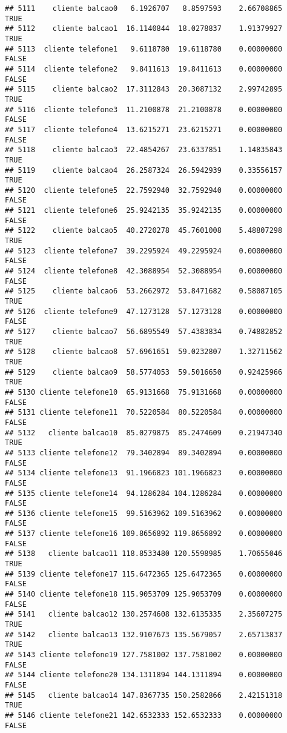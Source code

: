 \documentclass[
]{article}
\begin{document}
\begin{verbatim}
## 5111    cliente balcao0   6.1926707   8.8597593    2.66708865     TRUE
## 5112    cliente balcao1  16.1140844  18.0278837    1.91379927     TRUE
## 5113  cliente telefone1   9.6118780  19.6118780    0.00000000    FALSE
## 5114  cliente telefone2   9.8411613  19.8411613    0.00000000    FALSE
## 5115    cliente balcao2  17.3112843  20.3087132    2.99742895     TRUE
## 5116  cliente telefone3  11.2100878  21.2100878    0.00000000    FALSE
## 5117  cliente telefone4  13.6215271  23.6215271    0.00000000    FALSE
## 5118    cliente balcao3  22.4854267  23.6337851    1.14835843     TRUE
## 5119    cliente balcao4  26.2587324  26.5942939    0.33556157     TRUE
## 5120  cliente telefone5  22.7592940  32.7592940    0.00000000    FALSE
## 5121  cliente telefone6  25.9242135  35.9242135    0.00000000    FALSE
## 5122    cliente balcao5  40.2720278  45.7601008    5.48807298     TRUE
## 5123  cliente telefone7  39.2295924  49.2295924    0.00000000    FALSE
## 5124  cliente telefone8  42.3088954  52.3088954    0.00000000    FALSE
## 5125    cliente balcao6  53.2662972  53.8471682    0.58087105     TRUE
## 5126  cliente telefone9  47.1273128  57.1273128    0.00000000    FALSE
## 5127    cliente balcao7  56.6895549  57.4383834    0.74882852     TRUE
## 5128    cliente balcao8  57.6961651  59.0232807    1.32711562     TRUE
## 5129    cliente balcao9  58.5774053  59.5016650    0.92425966     TRUE
## 5130 cliente telefone10  65.9131668  75.9131668    0.00000000    FALSE
## 5131 cliente telefone11  70.5220584  80.5220584    0.00000000    FALSE
## 5132   cliente balcao10  85.0279875  85.2474609    0.21947340     TRUE
## 5133 cliente telefone12  79.3402894  89.3402894    0.00000000    FALSE
## 5134 cliente telefone13  91.1966823 101.1966823    0.00000000    FALSE
## 5135 cliente telefone14  94.1286284 104.1286284    0.00000000    FALSE
## 5136 cliente telefone15  99.5163962 109.5163962    0.00000000    FALSE
## 5137 cliente telefone16 109.8656892 119.8656892    0.00000000    FALSE
## 5138   cliente balcao11 118.8533480 120.5598985    1.70655046     TRUE
## 5139 cliente telefone17 115.6472365 125.6472365    0.00000000    FALSE
## 5140 cliente telefone18 115.9053709 125.9053709    0.00000000    FALSE
## 5141   cliente balcao12 130.2574608 132.6135335    2.35607275     TRUE
## 5142   cliente balcao13 132.9107673 135.5679057    2.65713837     TRUE
## 5143 cliente telefone19 127.7581002 137.7581002    0.00000000    FALSE
## 5144 cliente telefone20 134.1311894 144.1311894    0.00000000    FALSE
## 5145   cliente balcao14 147.8367735 150.2582866    2.42151318     TRUE
## 5146 cliente telefone21 142.6532333 152.6532333    0.00000000    FALSE

\end{verbatim}
\end{document}
